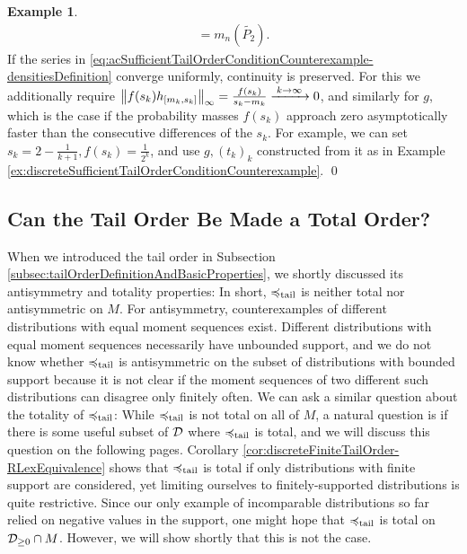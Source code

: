 \documentclass[a4paper]{scrreprt}
\theoremstyle{definition}
\newtheorem{ex}[thm]{Example} %
\begin{document}
\begin{ex}
\begin{multline*}
            = m_n(\tilde{P_2}).
        \end{multline*}
        If the series in \eqref{eq:acSufficientTailOrderConditionCounterexample-densitiesDefinition} converge uniformly, continuity is preserved.
        For this we additionally require $\left\lVert f(s_k) h_{[m_k, s_k]}\right\rVert_\infty = \frac{f(s_k)}{s_k - m_k} \xrightarrow{\;k \to \infty\;} 0$, and similarly for $g$, which is the case if the probability masses $f(s_k)$ approach zero asymptotically faster than the consecutive differences of the $s_k$. For example, we can set $s_k = 2-\frac{1}{k+1}, f(s_k) = \frac{1}{2^k}$, and use $g, (t_k)_k$ constructed from it as in Example \ref{ex:discreteSufficientTailOrderConditionCounterexample}.
        \qed
    \end{ex}
    
    \subsection{Can the Tail Order Be Made a Total Order?}
    \label{subsec:tailOrderTotality}
    When we introduced the tail order in Subsection \ref{subsec:tailOrderDefinitionAndBasicProperties}, we shortly discussed its antisymmetry and totality properties: In short, $\preccurlyeq_{\text{tail}}$ is neither total nor antisymmetric on $M$. For antisymmetry, counterexamples of different distributions with equal moment sequences exist. Different distributions with equal moment sequences necessarily have unbounded support, and we do not know whether $\preccurlyeq_{\text{tail}}$ is antisymmetric on the subset of distributions with bounded support because it is not clear if the moment sequences of two different such distributions can disagree only finitely often.
    We can ask a similar question about the totality of $\preccurlyeq_{\text{tail}}$: While $\preccurlyeq_{\text{tail}}$ is not total on all of $M$,
    a natural question is if there is some useful subset of $\mathcal{D}$ where $\preccurlyeq_{\text{tail}}$ is total, and we will discuss this question on the following pages.
    Corollary \ref{cor:discreteFiniteTailOrder-RLexEquivalence} shows that $\preccurlyeq_{\text{tail}}$ is total if only distributions with finite support are considered, yet limiting ourselves to finitely-supported distributions is quite restrictive.
    Since our only example of incomparable distributions so far relied on negative values in the support, one might hope that $\preccurlyeq_{\text{tail}}$ is total on $\mathcal{D}_{\geq 0} \cap M$. However, we will show shortly that this is not the case.
    
\end{document}
